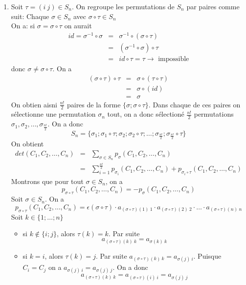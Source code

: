 \begin{enumerate}
  \item Soit $\tau = (i ~ j) \in S_n$. On regroupe les permutations de $S_n$ par paires comme suit: Chaque $\sigma \in S_n$ avec $\sigma \circ \tau \in S_n$ \\
    On a: si $\sigma = \sigma \circ \tau$ on aurait
    \begin{eqnarray*}
      id = \sigma^{-1} \circ \sigma &=& \sigma^{-1} \circ (\sigma \circ \tau) \\
        &=& (\sigma^{-1} \circ \sigma) \circ \tau \\
        &=& id \circ \tau = \tau \rightarrow\text{ impossible}
    \end{eqnarray*}
    donc $\sigma \neq \sigma \circ \tau$. On a
    \begin{eqnarray*}
      (\sigma \circ \tau) \circ \tau &=& \sigma \circ (\tau \circ \tau) \\
        &=& \sigma \circ (id) \\
        &=& \sigma 
    \end{eqnarray*}
    On obtien aisni $\frac{n!}{2}$ paires de la forme $\{\sigma; \sigma  \circ \tau\}$. Dans chaque de ces paires on sélectionne une permutation $\sigma_n$ tout, on a donc sélectioné $\frac{n!}{2}$ permutations $\sigma_1, \sigma_2, \ldots, \sigma_{\frac{n!}{2}}$. On a donc
    $$S_n = \{ \sigma_1; \sigma_1 \circ \tau; \sigma_2; \sigma_2 \circ \tau; \ldots; \sigma_{\frac{n!}{2}}; \sigma_{\frac{n!}{2}} \circ \tau \}$$
    On obtient 
    \begin{eqnarray*}
      det(C_1, C_2, \ldots, C_n) &=& \sum_{\sigma \in S_n} p_{\sigma}(C_1, C_2, \ldots, C_n) \\
       &=& \sum_{i=1}^{\frac{n!}{2}} p_{\sigma_i}(C_1, C_2, \ldots, C_n) + p_{\sigma_i \circ \tau}(C_1, C_2, \ldots, C_n)
    \end{eqnarray*}
    Montrons que pour tout $\sigma \in S_n$, on a
    $$p_{\sigma \circ \tau}(C_1, C_2, \ldots, C_n) = -p_{\sigma}(C_1, C_2, \ldots, C_n)$$
    Soit $\sigma \in S_n$. On a 
    $$p_{\sigma \circ \tau}(C_1, C_2, \ldots, C_n) = \epsilon(\sigma \circ \tau) \cdot a_{(\sigma \circ\tau)(1) ~ 1} \cdot a_{(\sigma \circ\tau)(2) ~ 2} \cdot \ldots \cdot a_{(\sigma \circ\tau)(n) ~ n}$$
    Soit $k \in \{1; \ldots; n\}$
    \begin{itemize}
      \item si $k\notin \{i; j\}$, alors $\tau(k) = k$. Par suite 
        $$a_{(\sigma \circ \tau)(k) ~ k} = a_{\sigma(k) ~ k}$$
      
      \item si $k = i$, alors $\tau(k) = j$. Par suite $a_{(\sigma \circ \tau)(k) ~ k} = a_{\sigma(j) ~ i}$. Puisque $C_i = C_j$ on a $a_{\sigma(j) ~ i} = a_{\sigma(j) ~ j}$. On a donc
        $$a_{(\sigma \circ \tau)(k) ~ k} = a_{(\sigma \circ \tau)(i) ~ i} = a_{\sigma(j) ~ j}$$
        

\end{itemize}
\end{enumerate}
